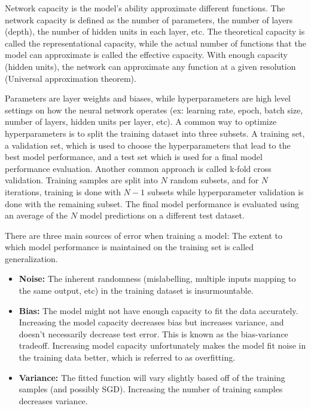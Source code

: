 \documentclass{article}
\begin{document}
Network capacity is the model's ability approximate different functions. The network capacity is defined as the number of parameters, the number of layers (depth), the number of hidden units in each layer, etc. The theoretical capacity is called the representational capacity, while the actual number of functions that the model can approximate is called the effective capacity. With enough capacity (hidden units), the network can approximate any function at a given resolution (Universal approximation theorem).

Parameters are layer weights and biases, while hyperparameters are high level settings on how the neural network operates (ex: learning rate, epoch, batch size, number of layers, hidden units per layer, etc). A common way to optimize hyperparameters is to split the training dataset into three subsets. A training set, a validation set, which is used to choose the hyperparameters that lead to the best model performance, and a test set which is used for a final model performance evaluation. Another common approach is called k-fold cross validation. Training samples are split into $N$ random subsets, and for $N$ iterations, training is done with $N - 1$ subsets while hyperparameter validation is done with the remaining subset. The final model performance is evaluated using an average of the $N$ model predictions on a different test dataset.

There are three main sources of error when training a model: The extent to which model performance is maintained on the training set is called generalization.
\begin{itemize}
\item \textbf{Noise:} The inherent randomness (mislabelling, multiple inputs mapping to the same output, etc) in the training dataset is insurmountable.
\item \textbf{Bias:} The model might not have enough capacity to fit the data accurately. Increasing the model capacity decreases bias but increases variance, and doesn't necessarily decrease test error. This is known as the bias-variance tradeoff. Increasing model capacity unfortunately makes the model fit noise in the training data better, which is referred to as overfitting.
\item \textbf{Variance:} The fitted function will vary slightly based off of the training samples (and possibly SGD). Increasing the number of training samples decreases variance.
\end{itemize}
\end{document}
